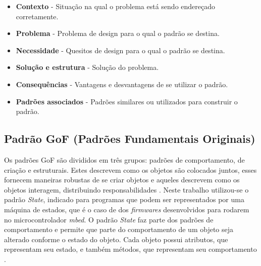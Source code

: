 \begin{itemize}
	\item \textbf{Contexto} - Situação na qual o problema está sendo endereçado corretamente.
	
	\item \textbf{Problema} - Problema de design para o qual o padrão se destina.
	
	\item \textbf{Necessidade} - Quesitos de design para o qual o padrão se destina.
	
	\item \textbf{Solução e estrutura} - Solução do problema.
	
	\item \textbf{Consequências} - Vantagens e desvantagens de se utilizar o padrão.
	
	\item \textbf{Padrões associados} - Padrões similares ou utilizados para construir o padrão.
\end{itemize}			  


\subsection{Padrão GoF (Padrões Fundamentais Originais)} \label{subsec:gof}
Os padrões GoF são divididos em três grupos: padrões de comportamento, de criação e estruturais. Estes descrevem como os objetos são colocados juntos, esses fornecem maneiras robustas de se criar objetos e aqueles descrevem como os objetos interagem, distribuindo responsabilidades \cite{Engholm:2010}. Neste trabalho utilizou-se o padrão \textit{State}, indicado para programas que podem ser representados por uma máquina de estados, que é o caso de dos \textit{firmwares} desenvolvidos para rodarem no microcontrolador \textit{mbed}. O padrão \textit{State} faz parte dos padrões de comportamento e permite que parte do comportamento de um objeto seja alterado conforme o estado do objeto. Cada objeto possui atributos, que representam seu estado, e também métodos, que representam seu comportamento \cite{Vinicius:2009}.